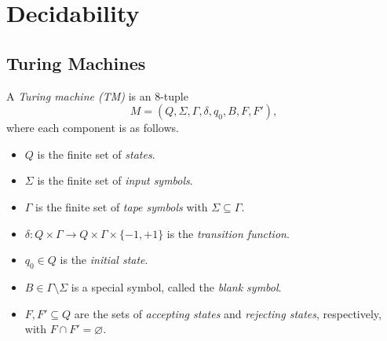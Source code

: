 \chapter{Decidability}
\section{Turing Machines}
\begin{definition}
  A \emph{Turing machine (TM)} is an 8-tuple
  \begin{equation*}
    M = (Q, \Sigma, \Gamma, \delta, q_0, B, F, F'),
  \end{equation*}
  where each component is as follows.
  \begin{itemize}
    \item $Q$ is the finite set of \emph{states}.
    \item $\Sigma$ is the finite set of \emph{input symbols}.
    \item $\Gamma$ is the finite set of \emph{tape symbols} with
    $\Sigma \subseteq \Gamma$.
    \item $\delta : Q \times \Gamma \to Q \times \Gamma \times \{-1, +1\}$
    is the \emph{transition function}.
    \item $q_0 \in Q$ is the \emph{initial state}.
    \item $B \in \Gamma \setminus \Sigma$ is a special symbol, called the
    \emph{blank symbol}.
    \item $F, F' \subseteq Q$ are the sets of \emph{accepting states} and
    \emph{rejecting states}, respectively, with $F \cap F' = \varnothing$.
  \end{itemize}
\end{definition}

